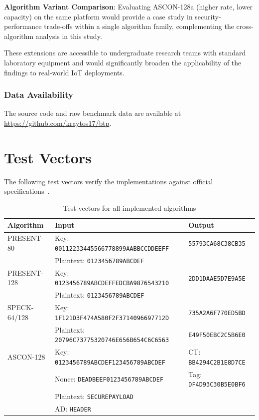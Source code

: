 \documentclass[12pt]{report}
\begin{document}
\textbf{Algorithm Variant Comparison}: Evaluating ASCON-128a (higher rate, lower capacity) on the same platform would provide a case study in security-performance trade-offs within a single algorithm family, complementing the cross-algorithm analysis in this study.

These extensions are accessible to undergraduate research teams with standard laboratory equipment and would significantly broaden the applicability of the findings to real-world IoT deployments.

\subsection*{Data Availability}
The source code and raw benchmark data are available at
\url{https://github.com/kraytos17/btp}.

\appendix
\chapter{Test Vectors}

The following test vectors verify the implementations against official specifications~\cite{bogdanov2007present,beaulieu2015simon,nist2025ascon}.

\begin{table}[H]
\centering
\begin{tabular}{lll}
\toprule
\textbf{Algorithm} & \textbf{Input} & \textbf{Output} \\
\midrule
PRESENT-80 & Key: \texttt{00112233445566778899AABBCCDDEEFF} & \texttt{55793CA68C38CB35} \\
           & Plaintext: \texttt{0123456789ABCDEF} & \\
\midrule
PRESENT-128 & Key: \texttt{0123456789ABCDEFFEDCBA9876543210} & \texttt{2DD1DAAE5D7E9A5E} \\
            & Plaintext: \texttt{0123456789ABCDEF} & \\
\midrule
SPECK-64/128 & Key: \texttt{1F121D3F474A580F2F3714096697712D} & \texttt{735A2A6F770ED5BD} \\
             & Plaintext: \texttt{20796C73775320746E656B654C6C6563} & \texttt{E49F50EBC2C5B6E0} \\
\midrule
ASCON-128 & Key: \texttt{0123456789ABCDEF123456789ABCDEF} & CT: \texttt{BB4294C2B1E8D7CE} \\
          & Nonce: \texttt{DEADBEEF0123456789ABCDEF} & Tag: \texttt{DF4D93C30B5E0BF6} \\
          & Plaintext: \texttt{SECUREPAYLOAD} & \\
          & AD: \texttt{HEADER} & \\
\bottomrule
\end{tabular}
\caption{Test vectors for all implemented algorithms}
\label{tab:test-vectors}
\end{table}
\end{document}
